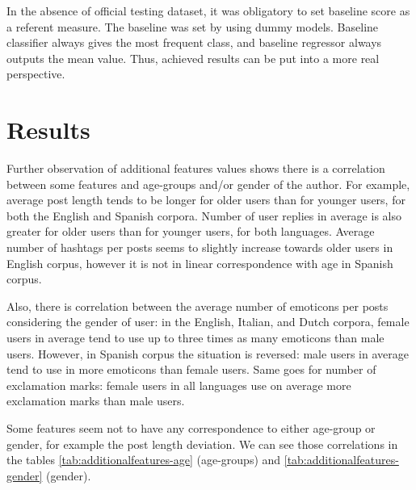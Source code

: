 \documentclass[10pt, a4paper]{article}
\begin{document}
In the absence of official testing dataset, it was obligatory to set baseline score as a referent measure.
The baseline was set by using dummy models.
Baseline classifier always gives the most frequent class, and baseline regressor always outputs the mean value.
Thus, achieved results can be put into a more real perspective.

\section{Results}
\label{sec:results}

Further observation of additional features values shows there is a correlation between some features and age-groups and/or gender of the author.
For example, average post length tends to be longer for older users than for younger users, for both the English and Spanish corpora.
Number of user replies in average is also greater for older users than for younger users, for both languages.
Average number of hashtags per posts seems to slightly increase towards older users in English corpus, however it is not in linear correspondence with age in Spanish corpus.

Also, there is correlation between the average number of emoticons per posts considering the gender of user: in the English, Italian, and Dutch corpora, female users in average tend to use up to three times as many emoticons than male users.
However, in Spanish corpus the situation is reversed: male users in average tend to use in more emoticons than female users.
Same goes for number of exclamation marks: female users in all languages use on average more exclamation marks than male users.

Some features seem not to have any correspondence to either age-group or gender, for example the post length deviation.
We can see those correlations in the tables \ref{tab:additionalfeatures-age} (age-groups) and \ref{tab:additionalfeatures-gender} (gender).
\end{document}
